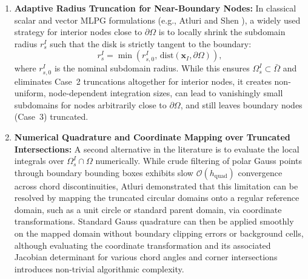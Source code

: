 \documentclass[preprint,12pt]{elsarticle}
\begin{document}
\begin{enumerate}
    \item \textbf{Adaptive Radius Truncation for Near-Boundary Nodes:}
          In classical scalar and vector MLPG formulations (e.g., Atluri and Shen \cite{atluri2002meshless}), a widely used strategy for interior nodes close to $\partial\Omega$ is to locally shrink the subdomain radius $r_s^I$ such that the disk is strictly tangent to the boundary:
          \begin{equation}
              r_s^I = \min\left(r_{s, 0}^I, \, \mathrm{dist}(\mathbf{x}_I, \partial\Omega)\right),
              \label{eq:radius_shrink_tangent}
          \end{equation}
          where $r_{s, 0}^I$ is the nominal subdomain radius. While this ensures $\Omega_s^I \subset \bar{\Omega}$ and eliminates Case~2 truncations altogether for interior nodes, it creates non-uniform, node-dependent integration sizes, can lead to vanishingly small subdomains for nodes arbitrarily close to $\partial\Omega$, and still leaves boundary nodes (Case~3) truncated.

    \item \textbf{Numerical Quadrature and Coordinate Mapping over Truncated Intersections:}
          A second alternative in the literature is to evaluate the local integrals over $\Omega_s^I \cap \Omega$ numerically. While crude filtering of polar Gauss points through boundary bounding boxes exhibits slow $\mathcal{O}(h_{\mathrm{quad}})$ convergence across chord discontinuities, Atluri \cite{atluri2004meshless} demonstrated that this limitation can be resolved by mapping the truncated circular domains onto a regular reference domain, such as a unit circle or standard parent domain, via coordinate transformations. Standard Gauss quadrature can then be applied smoothly on the mapped domain without boundary clipping errors or background cells, although evaluating the coordinate transformation and its associated Jacobian determinant for various chord angles and corner intersections introduces non-trivial algorithmic complexity.


\end{enumerate}
\end{document}
